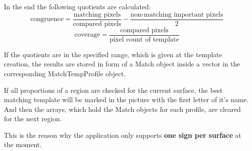 In the end the following quotients are calculated:
$$
	\mbox{congruence} =\frac{\mbox{matching pixels}}{\mbox{compared pixels}}-\frac{\mbox{non-matching important pixels}}{2}
$$
$$
	\mbox{coverage} = \frac{\mbox{compared pixels}}{\mbox{pixel count of template}}
$$

If the quotients are in the specified range, which is given at the template creation, the results 
are stored in form of a Match object inside a vector in the corresponding MatchTempProfile object.

If all proportions of a region are checked for the current surface, the best matching template will
be marked in the picture with the first letter of it's name. And then the arrays,
which hold the Match objects for each profile, are cleared for the next region.

This is the reason why the application only supports \textbf{one sign per surface} at the moment.
